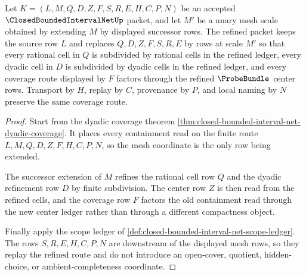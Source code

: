 \begin{theorem}
\label{thm:closed-bounded-interval-net-unary-mesh-monotonicity}
Let $K=(L,M,Q,D,Z,F,S,R,E,H,C,P,N)$ be an accepted $\ClosedBoundedIntervalNetUp$ packet, and let $M'$ be a unary mesh scale obtained by extending $M$ by displayed successor rows. The refined packet keeps the source row $L$ and replaces $Q,D,Z,F,S,R,E$ by rows at scale $M'$ so that every rational cell in $Q$ is subdivided by rational cells in the refined ledger, every dyadic cell in $D$ is subdivided by dyadic cells in the refined ledger, and every coverage route displayed by $F$ factors through the refined $\ProbeBundle$ center rows. Transport by $H$, replay by $C$, provenance by $P$, and local naming by $N$ preserve the same coverage route.
\end{theorem}
\begin{proof}
Start from the dyadic coverage theorem \autoref{thm:closed-bounded-interval-net-dyadic-coverage}. It places every containment read on the finite route $L,M,Q,D,Z,F,H,C,P,N$, so the mesh coordinate is the only row being extended.

The successor extension of $M$ refines the rational cell row $Q$ and the dyadic refinement row $D$ by finite subdivision. The center row $Z$ is then read from the refined cells, and the coverage row $F$ factors the old containment read through the new center ledger rather than through a different compactness object.

Finally apply the scope ledger of \autoref{def:closed-bounded-interval-net-scope-ledger}. The rows $S,R,E,H,C,P,N$ are downstream of the displayed mesh rows, so they replay the refined route and do not introduce an open-cover, quotient, hidden-choice, or ambient-completeness coordinate.
\end{proof}

